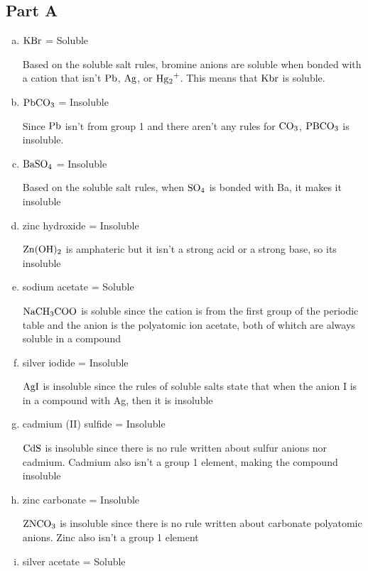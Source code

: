 \documentclass{scrartcl}
\begin{document}
\subsection{Part A}
\label{sec:orgdb7a29b}
\begin{enumerate}[a.]
\item \(\ce{KBr}\) = Soluble

Based on the soluble salt rules, bromine anions are
soluble when bonded with a cation that isn't \(\ce{Pb}\), \(\ce{Ag}\),
or \(\ce{Hg2+}\). This means that \(\ce{Kbr}\) is soluble.

\item \(\ce{PbCO3}\) = Insoluble

Since \(\ce{Pb}\) isn't from group 1 and there
aren't any rules for \(\ce{CO3}\), \(\ce{PBCO3}\) is insoluble.

\item \(\ce{BaSO4}\) = Insoluble

Based on the soluble salt rules, when
\(\ce{SO4}\) is bonded with Ba, it makes it insoluble

\item zinc hydroxide = Insoluble

\(\ce{Zn(OH)2}\) is amphateric but it isn't a
strong acid or a strong base, so its insoluble

\item sodium acetate = Soluble

\(\ce{NaCH3COO}\) is soluble since the cation is
from the first group of the periodic table and the anion is the polyatomic
ion acetate, both of whitch are always soluble in a compound

\item silver iodide = Insoluble

\(\ce{AgI}\) is insoluble since the rules of
soluble salts state that when the anion I is in a compound with Ag, then it
is insoluble

\item cadmium (II) sulfide = Insoluble

\(\ce{CdS}\) is insoluble since there is
no rule written about sulfur anions nor cadmium. Cadmium also isn't a group 1
element, making the compound insoluble

\item zinc carbonate = Insoluble

\(\ce{ZNCO3}\) is insoluble since there is no
rule written about carbonate polyatomic anions. Zinc also isn't a group 1
element

\item silver acetate = Soluble


\end{enumerate}
\end{document}
